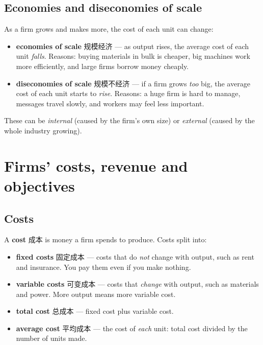 \documentclass[11pt]{article}
\begin{document}
\subsection*{Economies and diseconomies of scale}

As a firm grows and makes more, the cost of each unit can change:

\begin{itemize}
\item \textbf{economies of scale} 规模经济 — as output rises, the average cost of each unit \emph{falls}. Reasons: buying materials in bulk is cheaper, big machines work more efficiently, and large firms borrow money cheaply.

\item \textbf{diseconomies of scale} 规模不经济 — if a firm grows \emph{too} big, the average cost of each unit starts to \emph{rise}. Reasons: a huge firm is hard to manage, messages travel slowly, and workers may feel less important.

\end{itemize}

These can be \emph{internal} (caused by the firm's own size) or \emph{external} (caused by the whole industry growing).

\section*{Firms' costs, revenue and objectives}

\subsection*{Costs}

A \textbf{cost} 成本 is money a firm spends to produce. Costs split into:

\begin{itemize}
\item \textbf{fixed costs} 固定成本 — costs that do \emph{not} change with output, such as rent and insurance. You pay them even if you make nothing.

\item \textbf{variable costs} 可变成本 — costs that \emph{change} with output, such as materials and power. More output means more variable cost.

\item \textbf{total cost} 总成本 — fixed cost plus variable cost.

\item \textbf{average cost} 平均成本 — the cost of \emph{each} unit: total cost divided by the number of units made.

\end{itemize}
\end{document}
